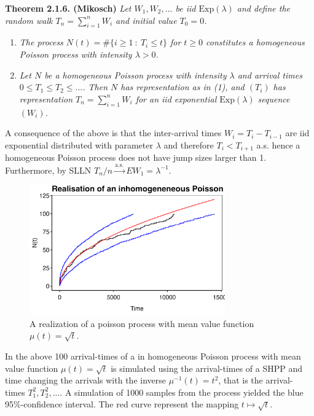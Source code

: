 \documentclass[a4paper,12pt,openany]{book}
\providecommand{\tightlist}{%
 \setlength{\itemsep}{0pt}\setlength{\parskip}{0pt}}
\begin{document}
\textbf{Theorem 2.1.6. (Mikosch)} \emph{Let \(W_1,W_2,...\) be iid \(\text{Exp}(\lambda)\) and define the random walk \(T_n=\sum_{i=1}^n W_i\) and initial value \(T_0=0\).}

\begin{enumerate}
\def\labelenumi{(\arabic{enumi})}
\tightlist
\item
  \emph{The process \(N(t)=\# \{i\ge 1\ :\ T_i\le t\}\) for \(t\ge 0\) constitutes a homogeneous Poisson process with intensity \(\lambda >0\).}
\item
  \emph{Let \(N\) be a homogeneous Poisson process with intensity \(\lambda\) and arrival times \(0 \le T_1 \le T_2 \le ...\). Then \(N\) has representation as in (1), and \((T_i)\) has representation \(T_n=\sum_{i=1}^n W_i\) for an iid exponential \(\text{Exp}(\lambda)\) sequence \((W_i)\).}
\end{enumerate}

A consequence of the above is that the inter-arrival times \(W_i=T_i-T_{i-1}\) are iid exponential distributed with parameter \(\lambda\) and therefore \(T_i<T_{i+1}\) a.s. hence a homogeneous Poisson process does not have jump sizes larger than 1. Furthermore, by SLLN \(T_n/n \stackrel{\text{a.s.}}{\to} E W_1=\lambda^{-1}\).

\begin{figure}[H]
  \begin{center}
    \includegraphics[width=0.75\textwidth]{figures/skade1_plot2.png}
  \end{center}
  \caption{A realization of a poisson process with mean value function $\mu(t)=\sqrt{t}$.}
\end{figure}

In the above 100 arrival-times of a in homogeneous Poisson process with mean value function \(\mu(t)=\sqrt{t}\) is simulated using the arrival-times of a SHPP and time changing the arrivals with the inverse \(\mu^{-1}(t)=t^2\), that is the arrival- times \(T_1^2,T_2^2,...\). A simulation of 1000 samples from the process yielded the blue 95\%-confidence interval. The red curve represent the mapping \(t\mapsto \sqrt{t}\).
\end{document}
